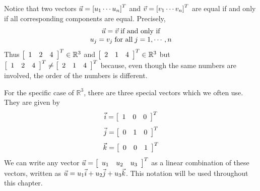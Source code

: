 Notice that two vectors $\vec{u} = \left[ u_{1} \cdots u_{n}\right]^T $ and
$\vec{v}=\left[ v_{1} \cdots v_{n}\right]^T$ are equal if and only if
all corresponding components are equal. Precisely,
\begin{equation*}
\begin{array}{c}
\vec{u}=\vec{v} \; \mbox{if and only if}\\
u_{j}=v_{j} \; \mbox{for all}\; j=1,\cdots ,n
\end{array}
\end{equation*} 
Thus 
$\left[ 
\begin{array}{rrr}
1  & 2 & 4
\end{array}
\right]^T \in \mathbb{R}^{3}$ and $\left[ 
\begin{array}{rrr}
2 & 1 & 4
\end{array}
\right]^T \in
\mathbb{R}^{3}$ but $\left[ 
\begin{array}{rrr}
1 & 2 & 4
\end{array}
\right]^T \neq \left[
\begin{array}{rrr}
2 & 1 & 4
\end{array}
\right]^T $ because,
even though the same numbers are involved, the order of the numbers is different. 

For the specific case of $\mathbb{R}^3$, there are three special vectors which we often use. 
They are given by 
\begin{equation*}
\vec{i} = 
\left[
\begin{array}{rrr}
1 & 0 & 0
\end{array}
\right]^T
\end{equation*}
\begin{equation*}
\vec{j} = 
\left[
\begin{array}{rrr}
0 & 1 & 0
\end{array}
\right]^T
\end{equation*}
\begin{equation*}
\vec{k} = 
\left[
\begin{array}{rrr}
0 & 0 & 1
\end{array}
\right]^T
\end{equation*}
We can write any vector $\vec{u} = 
\left[
\begin{array}{rrr}
u_1 & u_2 & u_3
\end{array}
\right]^T$
as a linear combination of these vectors, written as $\vec{u} = u_1 \vec{i} + u_2 \vec{j} + u_3 \vec{k}$. This notation will be used throughout 
this chapter.